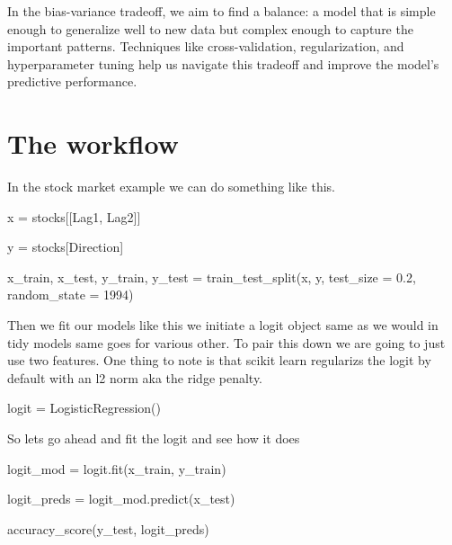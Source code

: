 \documentclass[
  letterpaper,
  DIV=11,
  numbers=noendperiod]{scrreprt}
\newenvironment{Shaded}{\begin{snugshade}}{\end{snugshade}}
\newcommand{\DecValTok}[1]{\textcolor[rgb]{0.68,0.00,0.00}{#1}}
\newcommand{\FloatTok}[1]{\textcolor[rgb]{0.68,0.00,0.00}{#1}}
\newcommand{\NormalTok}[1]{\textcolor[rgb]{0.00,0.23,0.31}{#1}}
\newcommand{\OperatorTok}[1]{\textcolor[rgb]{0.37,0.37,0.37}{#1}}
\newcommand{\StringTok}[1]{\textcolor[rgb]{0.13,0.47,0.30}{#1}}
\begin{document}
In the bias-variance tradeoff, we aim to find a balance: a model that is
simple enough to generalize well to new data but complex enough to
capture the important patterns. Techniques like cross-validation,
regularization, and hyperparameter tuning help us navigate this tradeoff
and improve the model's predictive performance.

\section{The workflow}\label{the-workflow}

In the stock market example we can do something like this.

\begin{Shaded}
\begin{Highlighting}[]

\NormalTok{x }\OperatorTok{=}\NormalTok{ stocks[[}\StringTok{\textquotesingle{}Lag1\textquotesingle{}}\NormalTok{, }\StringTok{\textquotesingle{}Lag2\textquotesingle{}}\NormalTok{]]}

\NormalTok{y }\OperatorTok{=}\NormalTok{ stocks[}\StringTok{\textquotesingle{}Direction\textquotesingle{}}\NormalTok{]}

\NormalTok{x\_train, x\_test, y\_train, y\_test }\OperatorTok{=}\NormalTok{ train\_test\_split(x, y, test\_size }\OperatorTok{=} \FloatTok{0.2}\NormalTok{, random\_state }\OperatorTok{=} \DecValTok{1994}\NormalTok{)}
\end{Highlighting}
\end{Shaded}

Then we fit our models like this we initiate a logit object same as we
would in tidy models same goes for various other. To pair this down we
are going to just use two features. One thing to note is that scikit
learn regularizs the logit by default with an l2 norm aka the ridge
penalty.

\begin{Shaded}
\begin{Highlighting}[]


\NormalTok{logit }\OperatorTok{=}\NormalTok{ LogisticRegression()}
\end{Highlighting}
\end{Shaded}

So lets go ahead and fit the logit and see how it does

\begin{Shaded}
\begin{Highlighting}[]
\NormalTok{logit\_mod }\OperatorTok{=}\NormalTok{ logit.fit(x\_train, y\_train)}

\NormalTok{logit\_preds }\OperatorTok{=}\NormalTok{ logit\_mod.predict(x\_test)}


\NormalTok{accuracy\_score(y\_test, logit\_preds)}
\end{Highlighting}
\end{Shaded}
\end{document}
